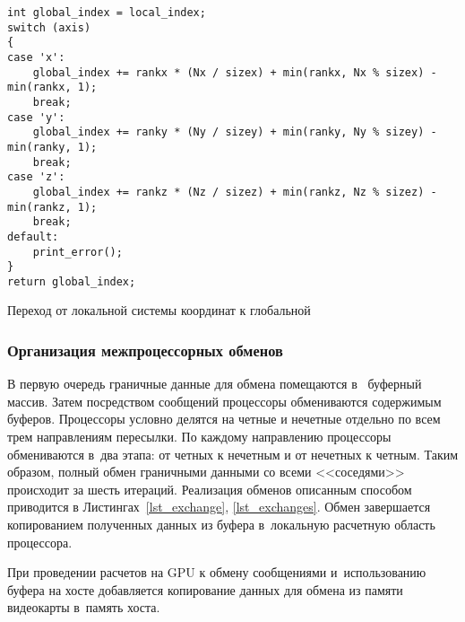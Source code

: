 \begin{listing}[!h]
\begin{verbatim}
int global_index = local_index;
switch (axis)
{
case 'x':
    global_index += rankx * (Nx / sizex) + min(rankx, Nx % sizex) - min(rankx, 1);
    break;
case 'y':
    global_index += ranky * (Ny / sizey) + min(ranky, Ny % sizey) - min(ranky, 1);
    break;
case 'z':
    global_index += rankz * (Nz / sizez) + min(rankz, Nz % sizez) - min(rankz, 1);
    break;
default:
    print_error();
}
return global_index;
\end{verbatim}
\caption{Переход от локальной системы координат к глобальной}
\label{lst_localglobal}
\end{listing}

\subsubsection{Организация межпроцессорных обменов}

В первую очередь граничные данные для обмена помещаются в~
буферный массив. Затем посредством сообщений процессоры
обмениваются содержимым буферов. Процессоры условно делятся
на четные и нечетные отдельно по всем трем направлениям пересылки.
По каждому направлению процессоры обмениваются в~два этапа:
от четных к нечетным и от нечетных к четным. Таким образом,
полный обмен граничными данными со всеми <<соседями>> происходит
за шесть итераций. Реализация обменов описанным способом 
приводится в Листингах~\ref{lst_exchange}, \ref{lst_exchanges}. 
Обмен завершается копированием
полученных данных из буфера в~локальную расчетную область процессора.

При проведении расчетов на GPU к обмену сообщениями и~использованию
буфера на хосте
добавляется копирование данных для обмена из памяти видеокарты
в~память хоста.


